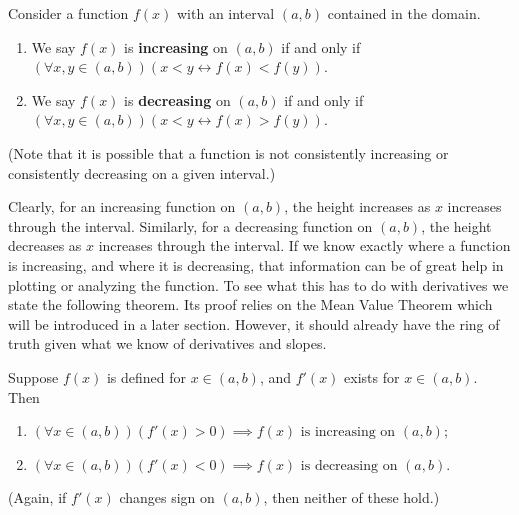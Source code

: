 \begin{definition}
Consider a function $f(x)$ with an interval $(a,b)$ contained in the domain.
\begin{enumerate}
\item We say $f(x)$ is {\bf increasing} on $(a,b)$ if and only if
      $(\forall x,y\in(a,b))(x<y\longleftrightarrow f(x)<f(y))$.
\item We say $f(x)$ is {\bf decreasing} on $(a,b)$ if and only if
      $(\forall x,y\in(a,b))(x<y\longleftrightarrow f(x)>f(y))$.
\end{enumerate}
(Note that it is possible that a function is not consistently increasing or
consistently decreasing on a given interval.)\end{definition}
Clearly, for an increasing function on $(a,b)$, the height increases
as $x$ increases through the interval.  Similarly, for
a decreasing function on $(a,b)$, the height decreases
as $x$ increases through the interval.  If we know exactly
where a function is increasing, and where it is decreasing,
that information can be of great help in plotting or 
analyzing the function.  To see what this has to 
do with derivatives we state the following theorem.  Its 
proof relies on the Mean Value Theorem which will be introduced
in a later section.  However, it should already have the ring of 
truth given what we know of derivatives and slopes.

\begin{theorem}Suppose $f(x)$ is defined for $x\in(a,b)$, and $f'(x)$
              exists for $x\in(a,b)$.  Then
  \begin{enumerate}
   \item $ (\forall x\in(a,b))(f'(x)>0)
                     \implies f(x)\text{ is increasing on }(a,b)$;
   \item $ (\forall x\in(a,b))(f'(x)<0)
                     \implies f(x)\text{ is decreasing on }(a,b)$.
  \end{enumerate}
(Again, if $f'(x)$ changes sign on $(a,b)$, then neither of these hold.)
\end{theorem}


